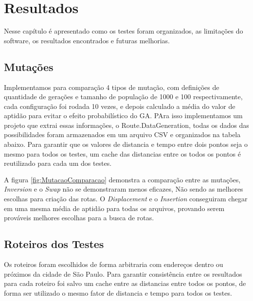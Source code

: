 \chapter{Resultados}
Nesse capítulo é apresentado como os testes foram organizados, as limitações do software, os resultados encontrados e futuras melhorias.


\section{Mutações}
Implementamos para comparação 4 tipos de mutação, com definições de quantidade de gerações e tamanho de população de 1000 e 100 respectivamente, cada configuração foi rodada 10 vezes, e depois calculado a média do valor de aptidão para evitar o efeito probabilístico do GA. PAra isso implementamos um projeto que extrai essas informações, o Route.DataGeneration, todas os dados das possibilidades foram armazenados em um arquivo CSV e organizados na tabela abaixo. 
Para garantir que os valores de distancia e tempo entre dois pontos seja o mesmo para todos os testes, um cache das distancias entre os todos os pontos é reutilizado para cada um dos testes.

\begin{center}
	\label{fig:MutacaoComparacao}
\end{center}

A figura \ref{fig:MutacaoComparacao} demonstra a comparação entre as mutações, \textit{Inversion} e o \textit{Swap} não se demonstraram menos eficazes, Não sendo as melhores escolhas para criação das rotas. O \textit{Displacement} e o \textit{Insertion} conseguiram chegar em uma mesma média de aptidão para todas os arquivos, provando serem prováveis melhores escolhas para a busca de rotas.


\pagebreak
\section{Roteiros dos Testes}
Os roteiros foram escolhidos de forma arbitraria com endereços dentro ou próximos da cidade de São Paulo. Para garantir consistência entre os resultados para cada roteiro foi salvo um cache entre as distancias entre todos os pontos, de forma  ser utilizado o mesmo fator de distancia e tempo para todos os testes.


